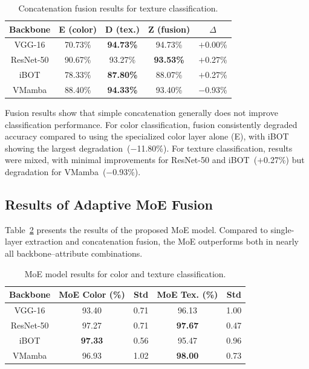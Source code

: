 \documentclass[letterpaper, 10 pt, conference]{ieeeconf}
\begin{document}
\begin{table}[htbp]
\caption{Concatenation fusion results for texture classification.}
\begin{center}
\begin{tabular}{c|c|c|c|c}
\hline
\textbf{Backbone} & \textbf{E (color)} & \textbf{D (tex.)}
                  & \textbf{Z (fusion)} & \textbf{$\Delta$} \\
\hline
VGG-16    & 70.73\% & \textbf{94.73\%} & 94.73\% & $+$0.00\% \\
ResNet-50 & 90.67\% & 93.27\%          & \textbf{93.53\%} & $+$0.27\% \\
iBOT      & 78.33\% & \textbf{87.80\%} & 88.07\% & $+$0.27\% \\
VMamba    & 88.40\% & \textbf{94.33\%} & 93.40\% & $-$0.93\% \\
\hline
\end{tabular}
\label{tab7}
\end{center}
\end{table}

Fusion results show that simple concatenation generally does not improve
classification performance.
For color classification, fusion consistently degraded accuracy compared
to using the specialized color layer alone (E), with iBOT showing the
largest degradation~($-$11.80\%).
For texture classification, results were mixed, with minimal improvements
for ResNet-50 and iBOT~($+$0.27\%) but degradation for VMamba~($-$0.93\%).

\subsection{Results of Adaptive MoE Fusion}

Table~\ref{tab_moe} presents the results of the proposed MoE model.
Compared to single-layer extraction and concatenation fusion, the MoE
outperforms both in nearly all backbone–attribute combinations.

\begin{table}[htbp]
\caption{MoE model results for color and texture classification.}
\begin{center}
\begin{tabular}{c|c|c|c|c}
\hline
\textbf{Backbone} & \textbf{MoE Color (\%)} & \textbf{Std}
                  & \textbf{MoE Tex. (\%)} & \textbf{Std} \\
\hline
VGG-16    & 93.40 & 0.71 & 96.13 & 1.00 \\
ResNet-50 & 97.27 & 0.71 & \textbf{97.67} & 0.47 \\
iBOT      & \textbf{97.33} & 0.56 & 95.47 & 0.96 \\
VMamba    & 96.93 & 1.02 & \textbf{98.00} & 0.73 \\
\hline
\end{tabular}
\label{tab_moe}
\end{center}
\end{table}
\end{document}
